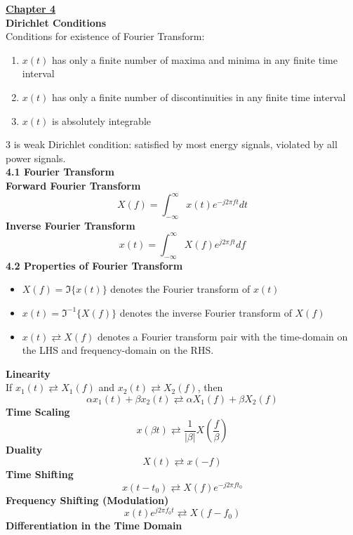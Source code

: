\documentclass[6pt,landscape,a4paper]{extarticle}
\begin{document}
\begin{multicols*}{5}
    \textbf{\uline{Chapter 4}}\\
    \textbf{Dirichlet Conditions}\\
    Conditions for existence of Fourier Transform:
    \begin{enumerate}
        \item $x(t)$ has only a finite number of maxima and minima in any finite time interval
        \item $x(t)$ has only a finite number of discontinuities in any finite time interval
        \item $x(t)$ is absolutely integrable
    \end{enumerate}
    3 is weak Dirichlet condition: satisfied by most energy signals, violated by all power signals.\\
    \textbf{4.1 Fourier Transform}\\
    \textbf{Forward Fourier Transform}
    \[
        X(f)=\int_{-\infty}^{\infty}x(t)e^{-j2\pi ft}dt \tag{4.1a}
    \]
    \textbf{Inverse Fourier Transform}
    \[
       x(t)=\int_{-\infty}^{\infty}X(f)e^{j2\pi ft}df \tag{4.1b} 
    \]
    \textbf{4.2 Properties of Fourier Transform}
    \begin{itemize}
        \item $X(f)=\Im\{x(t)\}$ denotes the Fourier transform of $x(t)$
        \item $x(t)={\Im}^{-1}\{X(f)\}$ denotes the inverse Fourier transform of $X(f)$
        \item $x(t) \rightleftarrows X(f)$ denotes a Fourier transform pair with the time-domain on the LHS and frequency-domain on the RHS.
    \end{itemize}
    \textbf{Linearity}\\
    If $x_1(t) \rightleftarrows X_1(f)$ and $x_2(t) \rightleftarrows X_2(f)$, then \[
        \alpha x_1(t) + \beta x_2(t)\rightleftarrows \alpha X_1(f) + \beta X_2 (f) \tag{4.2}
    \]
    \textbf{Time Scaling}\\
    \[
        x(\beta t) \rightleftarrows \frac{1}{|\beta|} X\left( \frac{f}{\beta}\right) \tag{4.3}
    \]
    \textbf{Duality}\\
    \[
        X(t) \rightleftarrows x(-f) \tag{4.4}
    \]
    \textbf{Time Shifting}\\
    \[
        x(t-t_0) \rightleftarrows X(f)e^{-j2\pi ft_0} \tag{4.5}
    \]
    \textbf{Frequency Shifting (Modulation)}\\
    \[
        x(t)e^{j2\pi f_0t} \rightleftarrows X(f-f_0) \tag{4.6}
    \]
    \textbf{Differentiation in the Time Domain}\\

\end{multicols*}
\end{document}
